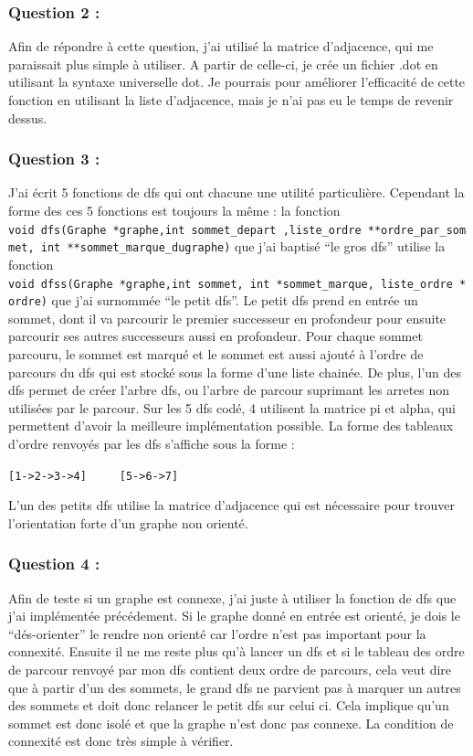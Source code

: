 \documentclass[]{article}
\begin{document}
\subsubsection{Question 2 :}\label{question-2}

Afin de répondre à cette question, j'ai utilisé la matrice d'adjacence,
qui me paraissait plus simple à utiliser. A partir de celle-ci, je crée
un fichier .dot en utilisant la syntaxe universelle dot. Je pourrais
pour améliorer l'efficacité de cette fonction en utilisant la liste
d'adjacence, mais je n'ai pas eu le temps de revenir dessus.

\subsubsection{Question 3 :}\label{question-3}

J'ai écrit 5 fonctions de dfs qui ont chacune une utilité particulière.
Cependant la forme des ces 5 fonctions est toujours la même : la
fonction
\texttt{void\ dfs(Graphe\ *graphe,int\ sommet\_depart\ ,liste\_ordre\ **ordre\_par\_sommet,\ int\ **sommet\_marque\_dugraphe)}
que j'ai baptisé ``le gros dfs'' utilise la fonction
\texttt{void\ dfss(Graphe\ *graphe,int\ sommet,\ int\ *sommet\_marque,\ liste\_ordre\ *ordre)}
que j'ai surnommée ``le petit dfs''. Le petit dfs prend en entrée un
sommet, dont il va parcourir le premier successeur en profondeur pour
ensuite parcourir ses autres successeurs aussi en profondeur. Pour
chaque sommet parcouru, le sommet est marqué et le sommet est aussi
ajouté à l'ordre de parcours du dfs qui est stocké sous la forme d'une
liste chainée. De plus, l'un des dfs permet de créer l'arbre dfs, ou
l'arbre de parcour suprimant les arretes non utilisées par le parcour.
Sur les 5 dfs codé, 4 utilisent la matrice pi et alpha, qui permettent
d'avoir la meilleure implémentation possible. La forme des tableaux
d'ordre renvoyés par les dfs s'affiche sous la forme :

\texttt{{[}1-\textgreater{}2-\textgreater{}3-\textgreater{}4{]}\ \ \ \ \ {[}5-\textgreater{}6-\textgreater{}7{]}}

L'un des petits dfs utilise la matrice d'adjacence qui est nécessaire
pour trouver l'orientation forte d'un graphe non orienté.

\subsubsection{Question 4 :}\label{question-4}

Afin de teste si un graphe est connexe, j'ai juste à utiliser la
fonction de dfs que j'ai implémentée précédement. Si le graphe donné en
entrée est orienté, je dois le ``dés-orienter'' le rendre non orienté
car l'ordre n'est pas important pour la connexité. Ensuite il ne me
reste plus qu'à lancer un dfs et si le tableau des ordre de parcour
renvoyé par mon dfs contient deux ordre de parcours, cela veut dire que
à partir d'un des sommets, le grand dfs ne parvient pas à marquer un
autres des sommets et doit donc relancer le petit dfs sur celui ci. Cela
implique qu'un sommet est donc isolé et que la graphe n'est donc pas
connexe. La condition de connexité est donc très simple à vérifier.
\end{document}
